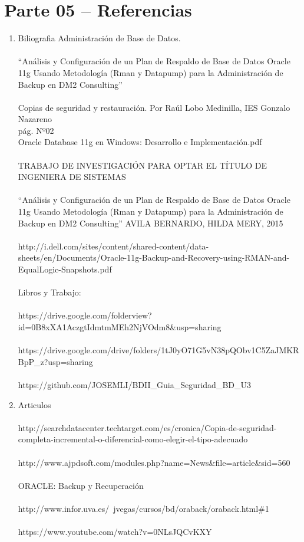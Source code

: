 \section{Parte 05 – Referencias} 

\begin{enumerate}[1.]
	\item Biliografia
	\subitem Administración de Base de Datos.
	\\\\“Análisis y Configuración de un Plan de Respaldo de Base de Datos Oracle 11g Usando Metodología (Rman y Datapump) para la Administración de Backup en DM2 Consulting”
	\\\\Copias de seguridad y restauración. Por Raúl Lobo Medinilla, IES Gonzalo Nazareno
	\\pág. Nº02
	\\Oracle Database 11g en Windows: Desarrollo e Implementación.pdf
	\\\\TRABAJO DE INVESTIGACIÓN PARA OPTAR EL TÍTULO DE INGENIERA DE SISTEMAS
	\\\\“Análisis y Configuración de un Plan de Respaldo de Base de Datos Oracle 11g Usando Metodología (Rman y Datapump) para la Administración de Backup en DM2 Consulting” AVILA BERNARDO, HILDA MERY, 2015
	\\\\http://i.dell.com/sites/content/shared-content/data-sheets/en/Documents/Oracle-11g-Backup-and-Recovery-using-RMAN-and-EqualLogic-Snapshots.pdf
	\\\\Libros y Trabajo: 
	\\\\https://drive.google.com/folderview?id=0B8xXA1AczgtIdmtmMEh2NjVOdm8\&usp=sharing
	\\\\https://drive.google.com/drive/folders/1tJ0yO71G5vN38pQObv1C5ZaJMKRBpP\_z?usp=sharing
	\\\\https://github.com/JOSEMLI/BDII\_Guia\_Seguridad\_BD\_U3

	\item Articulos
	\\\\http://searchdatacenter.techtarget.com/es/cronica/Copia-de-seguridad-completa-incremental-o-diferencial-como-elegir-el-tipo-adecuado
	\\\\http://www.ajpdsoft.com/modules.php?name=News\&file=article\&sid=560
	\\\\ORACLE: Backup y Recuperación 
	\\\\http://www.infor.uva.es/~jvegas/cursos/bd/oraback/oraback.html\#1
	\\\\https://www.youtube.com/watch?v=0NLsJQCvKXY
	

\end{enumerate} 
